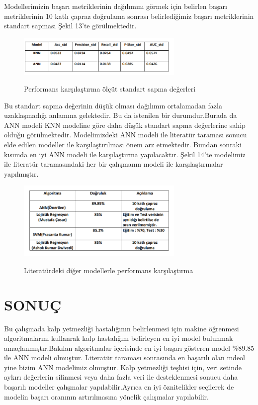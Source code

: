 \documentclass[conference]{IEEEtran}
\begin{document}
Modellerimizin başarı metriklerinin dağılımını görmek için belirlen başarı metriklerinin 10 katlı çapraz doğrulama sonrası belirlediğimiz başarı metriklerinin standart sapması Şekil 13'te görülmektedir.
\begin{figure}[htbp]
    \centering
   	\includegraphics[width=8cm]{images/sonucstd.PNG}\\
	\caption{Performans karşılaştırma ölçüt standart sapma değerleri}
    \label{fig}
\end{figure}
Bu standart sapma değerinin düşük olması dağılımın ortalamadan fazla uzaklaşmadığı anlamına gelektedir. Bu da istenilen bir durumdur.Burada da ANN modeli KNN modeline göre daha düşük standart sapma değerlerine sahip olduğu görülmektedir.
Modelimizdeki ANN modeli ile literatür taraması sonucu elde edilen modeller ile karşılaştırılması önem arz etmektedir. Bundan sonraki kısımda en iyi ANN modeli ile karşılaştırma yapılacaktır. Şekil 14'te modelimiz ile literatür taramasındaki her bir çalışmanın modeli ile karşılaştırmalar yapılmıştır.
\begin{figure}[htbp]
    \centering
   	\includegraphics[width=8cm]{images/karsilastirmaresim.PNG}\\
	\caption{Literatürdeki diğer modellerle performans karşılaştırma}
    \label{fig}
\end{figure}

\section{SONUÇ}
Bu çalışmada kalp yetmezliği hastalığının belirlenmesi için makine öğrenmesi algoritmalarını kullanrak kalp hastalığını belirleyen en iyi model bulunmak amaçlanmıştır.Bakılan algoritmalar içerisinde en iyi başarı gösteren model \%89.85 ile ANN modeli olmuştur. Literatür taraması sonrasında en başarılı olan mdeol yine bizim ANN modelimiz olmuştur.
Kalp yetmezliği teşhisi için, veri setinde aykırı değerlerin silinmesi veya daha fazla veri ile desteklenmesi sonucu daha başarılı modeller çalışmalar yapılabilir.Ayrıca en iyi öznitelikler seçilerek de modelin başarı oranının artırılmasına yönelik çalışmalar yapılabilir.

\printbibliography
\end{document}
